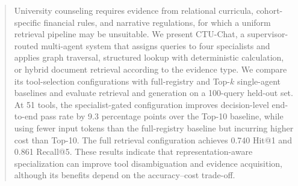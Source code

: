 \begin{abstract}
University counseling requires evidence from relational curricula, cohort-specific financial rules, and narrative regulations, for which a uniform retrieval pipeline may be unsuitable. We present CTU-Chat, a supervisor-routed multi-agent system that assigns queries to four specialists and applies graph traversal, structured lookup with deterministic calculation, or hybrid document retrieval according to the evidence type. We compare its tool-selection configurations with full-registry and Top-\(k\) single-agent baselines and evaluate retrieval and generation on a 100-query held-out set. At 51 tools, the specialist-gated configuration improves decision-level end-to-end pass rate by 9.3 percentage points over the Top-10 baseline, while using fewer input tokens than the full-registry baseline but incurring higher cost than Top-10. The full retrieval configuration achieves 0.740 Hit@1 and 0.861 Recall@5. These results indicate that representation-aware specialization can improve tool disambiguation and evidence acquisition, although its benefits depend on the accuracy–cost trade-off.

\end{abstract}
